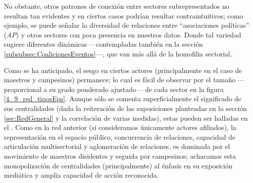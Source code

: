 \documentclass[letterpaper, 11pt]{book}
\theoremstyle{definition}
\theoremstyle{remark}
\begin{document}
No obstante, otros patrones de conexión entre sectores subrepresentados no resultan tan evidentes y en ciertos casos podrían resultar contraintuitivos; como ejemplo, se puede señalar la diversidad de relaciones entre ``asociaciones políticas'' (\emph{AP}) y otros sectores con poca presencia en nuestros datos. 
Donde tal variedad sugiere diferentes dinámicas ---contempladas también en la sección \ref{subsubsec:CoalicionesEventos}---, que van más allá de la homofilia sectorial.


Como se ha anticipado, el sesgo en ciertos actores (principalmente en el caso de maestros y campesinos) permanece; lo cual es fácil de observar por el tamaño ---proporcional a su grado ponderado ajustado--- de cada sector en la figura \ref{4_9_red_tiposEps}. 
Aunque sólo se comenta superficialmente el significado de sus centralidades (dada la reiteración de las suposiciones planteadas en la sección \ref{sec:RedGeneral} y la correlación de varias medidas), estas pueden ser halladas en el . 
Como en la red anterior (si consideramos únicamente actores afiliados), la representación en el espacio público, concurrencia de relaciones, capacidad de articulación multisectorial y aglomeración de relaciones, es dominada por el movimiento de maestros disidentes y seguida por campesinos; achacamos esta monopolización de centralidades (principalmente) al énfasis en su exposición mediática y amplia capacidad de acción reconocida. 
\end{document}

